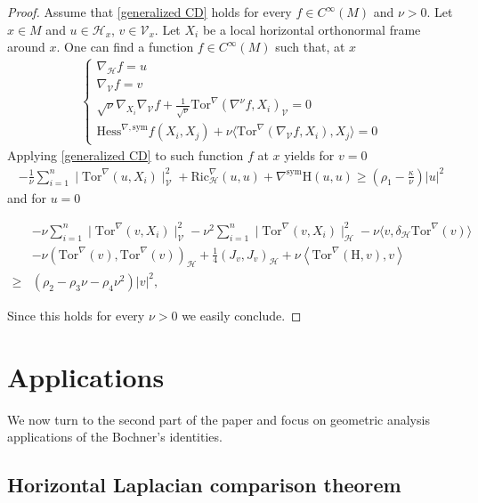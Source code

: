 \documentclass[11pt]{article}
\numberwithin{equation}{section}
\newcommand{\Ho}{\mathcal H}
\newcommand{\V}{\mathcal V}
\newcommand{\Tor}{\mathrm{Tor}}
\begin{document}
    \begin{proof}
        Assume that \eqref{generalized CD} holds for every $f \in C^\infty (M)$ and $\nu >0$.  Let $x \in M$ and $u \in \mathcal{H}_x$, $v \in \V_x$. Let $X_i$ be a local horizontal orthonormal frame around $x$. One can find a function $f \in C^\infty(M)$ such that, at $x$
 \begin{align*}
 \begin{cases}
 \nabla_\Ho f =u \\
 \nabla_\V f=v \\
 \sqrt{\nu} \nabla_{X_i} \nabla_{\mathcal{V}} f +\frac{1}{\sqrt{\nu}}\mathrm{Tor}^\nabla(\nabla^\nu f, X_i)_\V=0 \\
 \mathrm{Hess}^{\nabla, \mathrm{sym}} f(X_i , X_j)+\nu \langle \Tor^\nabla(\nabla_\V f,X_i),X_j \rangle=0
 \end{cases}
 \end{align*}
 Applying  \eqref{generalized CD} to such function $f$ at $x$ yields for $v=0$
 \begin{align*}
		  -\frac{1}{\nu}\sum_{i=1}^n\mid \mathrm{Tor}^\nabla(u, X_i)\mid_\V^2+\mathrm{Ric}_\Ho^\nabla(u, u )+ \nabla^{\mathrm{sym}}\mathrm H(u,u) \ge \left( \rho_1-\frac{\kappa}{\nu} \right) |u|^2
	\end{align*}
    and for $u=0$

    \begin{align*}
		&-\nu \sum_{i=1}^n\mid \mathrm{Tor}^\nabla(v, X_i)\mid_\V^2-\nu^2\sum_{i=1}^n\mid \mathrm{Tor}^\nabla(v, X_i)\mid_\Ho^2-\nu \langle v, \delta_\Ho \mathrm{Tor}^\nabla ( v) \rangle\\
		&-\nu (\mathrm{Tor}^\nabla (v),\mathrm{Tor}^\nabla (v) )_\Ho+\frac{1}{4}( J_{v} , J_{v} )_\Ho  +\nu \left\langle \mathrm{Tor}^\nabla (\mathrm H, v), v \right\rangle \\
        \ge & (\rho_2 -\rho_3 \nu -\rho_4 \nu^2) | v|^2,
	\end{align*}

    Since this holds for every $\nu>0$ we easily conclude.
    \end{proof}

    
	\section{Applications}

    We now turn to the second part of the paper and focus on geometric analysis applications of the Bochner's identities.

    \subsection{Horizontal Laplacian comparison theorem}
\end{document}
